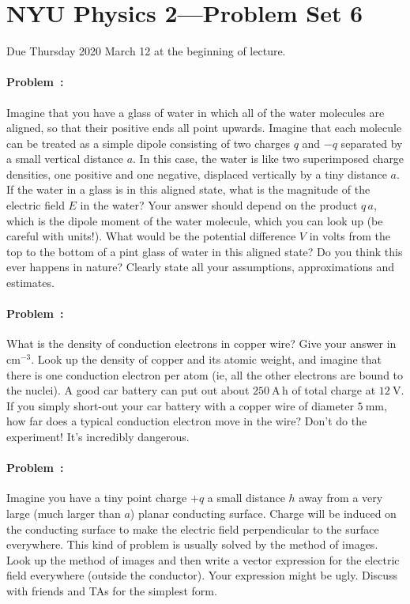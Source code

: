 \documentclass[12pt]{article}
\begin{document}
\section*{NYU Physics 2---Problem Set 6}

Due Thursday 2020 March 12 at the beginning of lecture.

\paragraph{Problem~\theproblem:}%
Imagine that you have a glass of water in which all of the water
molecules are aligned, so that their positive ends all point upwards.
Imagine that each molecule can be treated as a simple dipole
consisting of two charges $q$ and $-q$ separated by a small vertical
distance $a$.  In this case, the water is like two superimposed charge
densities, one positive and one negative, displaced vertically by a
tiny distance $a$.  If the water in a glass is in this aligned state,
what is the magnitude of the electric field $E$ in the water?  Your
answer should depend on the product $q\,a$, which is the dipole moment
of the water molecule, which you can look up (be careful with units!).  What would
be the potential difference $V$ in volts from the top to the bottom of
a pint glass of water in this aligned state? Do you think this ever
happens in nature? Clearly state all your assumptions, approximations
and estimates.

\paragraph{Problem~\theproblem:}%
What is the density of conduction electrons in copper wire?  Give your
answer in $\mathrm{cm^{-3}}$.  Look up the density of copper and its
atomic weight, and imagine that there is one conduction electron per
atom (ie, all the other electrons are bound to the nuclei).  A good
car battery can put out about $250~\mathrm{A\,h}$ of total charge at
$12~\mathrm{V}$.  If you simply short-out your car battery with a
copper wire of diameter $5~\mathrm{mm}$, how far does a typical
conduction electron move in the wire? Don't do the experiment! It's
incredibly dangerous.

\paragraph{Problem~\theproblem:}%
Imagine you have a tiny point charge $+q$ a small distance $h$ away
from a very large (much larger than $a$) planar conducting surface. Charge
will be induced on the conducting surface to make the electric field
perpendicular to the surface everywhere. This kind of problem is usually
solved by the method of images. Look up the method of images and
then write a vector expression for the electric field everywhere (outside
the conductor). Your expression might be ugly. Discuss with friends and
TAs for the simplest form.
\end{document}
